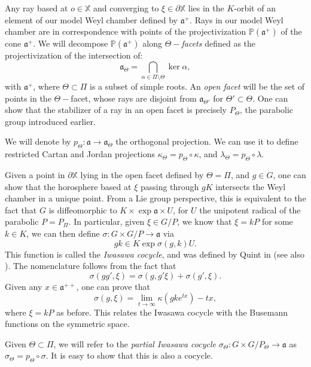 \documentclass{amsart}
\theoremstyle{remark}
\theoremstyle{definition}
\begin{document}
Any ray based at $o \in \mathbb{X}$ and converging to $\xi \in \partial \mathbb{X}$ lies in the $K$-orbit of an element of our model Weyl chamber defined by $\mathfrak{a}^+$.
Rays in our model Weyl chamber are in correspondence with points of the projectivization $\mathbb{P} (\mathfrak{a}^+)$ of the cone $\mathfrak{a}^+$.
We will decompose $\mathbb{P} (\mathfrak{a}^+)$ along $\Theta-$\emph{facets} defined as the projectivization of the intersection of:
$$\mathfrak{a}_\Theta = \bigcap_{\alpha \in \Pi \setminus \Theta} \ker \alpha,$$
with $\mathfrak{a}^+$, where $\Theta \subset \Pi$ is a subset of simple roots.
An \emph{open facet} will be the set of points in the $\Theta-$facet, whose rays are disjoint from $\mathfrak{a}_{\Theta'}$ for $\Theta' \subset \Theta$.
One can show that the stabilizer of a ray in an open facet is precisely $P_\Theta$, the parabolic group introduced earlier.

We will denote by $p_\Theta : \mathfrak{a} \to \mathfrak{a}_\Theta$ the orthogonal projection.
We can use it to define restricted Cartan and Jordan projections $\kappa_\Theta = p_\Theta \circ \kappa$, and $\lambda_\Theta = p_\Theta \circ \lambda$.

Given a point in $\partial \mathbb{X}$ lying in the open facet defined by $\Theta = \Pi$, and $g \in G$, one can show that the horosphere based at $\xi$ passing through $g K$ intersects the Weyl chamber in a unique point.
From a Lie group perspective, this is equivalent to the fact that $G$ is diffeomorphic to $K \times \exp \mathfrak{a} \times U$, for $U$ the unipotent radical of the parabolic $P = P_\Pi$.
In particular, given $\xi \in G/P$, we know that $\xi = k P$ for some $k \in K$, we can then define $\sigma : G \times G/P \to \mathfrak{a}$ via
$$g k \in K \exp \sigma (g,k) U.$$
This function is called the \emph{Iwasawa cocycle}, and was defined by Quint in \cite{quint2002patterson} (see also \cite{benoist2016random}).
The nomenclature follows from the fact that
$$\sigma (g g',\xi) = \sigma (g, g'\xi) + \sigma (g',\xi).$$
Given any $x \in \mathfrak{a}^{++}$, one can prove that
$$\sigma (g,\xi) = \lim_{t\to \infty } \kappa (gk e^{tx}) - tx,$$
where $\xi = k P$ as before.
This relates the Iwasawa cocycle with the Busemann functions on the symmetric space.

Given $\Theta \subset \Pi$, we will refer to the \emph{partial Iwasawa cocycle} $\sigma_\Theta : G \times G/P_\Theta \to \mathfrak{a}$ as $\sigma_\Theta = p_\Theta \circ \sigma$.
It is easy to show that this is also a cocycle.
\end{document}
